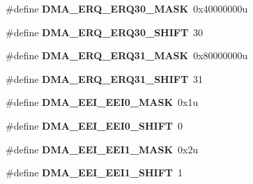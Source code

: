 \begin{DoxyCompactItemize}
\item 
\hypertarget{group___d_m_a___register___masks_gadb234616ad0f4a6c90070a3b9a4fefec}{}\#define {\bfseries D\+M\+A\+\_\+\+E\+R\+Q\+\_\+\+E\+R\+Q30\+\_\+\+M\+A\+S\+K}~0x40000000u\label{group___d_m_a___register___masks_gadb234616ad0f4a6c90070a3b9a4fefec}

\item 
\hypertarget{group___d_m_a___register___masks_ga719fe2117fcfe92235c29015478f55d3}{}\#define {\bfseries D\+M\+A\+\_\+\+E\+R\+Q\+\_\+\+E\+R\+Q30\+\_\+\+S\+H\+I\+F\+T}~30\label{group___d_m_a___register___masks_ga719fe2117fcfe92235c29015478f55d3}

\item 
\hypertarget{group___d_m_a___register___masks_ga725ce5d7f6bf2d069cfff6be1e7ab4b9}{}\#define {\bfseries D\+M\+A\+\_\+\+E\+R\+Q\+\_\+\+E\+R\+Q31\+\_\+\+M\+A\+S\+K}~0x80000000u\label{group___d_m_a___register___masks_ga725ce5d7f6bf2d069cfff6be1e7ab4b9}

\item 
\hypertarget{group___d_m_a___register___masks_ga4f543801f376ff65e158a8d4faf2dd19}{}\#define {\bfseries D\+M\+A\+\_\+\+E\+R\+Q\+\_\+\+E\+R\+Q31\+\_\+\+S\+H\+I\+F\+T}~31\label{group___d_m_a___register___masks_ga4f543801f376ff65e158a8d4faf2dd19}

\item 
\hypertarget{group___d_m_a___register___masks_gaacd526dbbb455151535c6e8d7e371477}{}\#define {\bfseries D\+M\+A\+\_\+\+E\+E\+I\+\_\+\+E\+E\+I0\+\_\+\+M\+A\+S\+K}~0x1u\label{group___d_m_a___register___masks_gaacd526dbbb455151535c6e8d7e371477}

\item 
\hypertarget{group___d_m_a___register___masks_gac4abb698bc75b24811557b2037d828c6}{}\#define {\bfseries D\+M\+A\+\_\+\+E\+E\+I\+\_\+\+E\+E\+I0\+\_\+\+S\+H\+I\+F\+T}~0\label{group___d_m_a___register___masks_gac4abb698bc75b24811557b2037d828c6}

\item 
\hypertarget{group___d_m_a___register___masks_gabb59616391e640e07162d0d33c0382d9}{}\#define {\bfseries D\+M\+A\+\_\+\+E\+E\+I\+\_\+\+E\+E\+I1\+\_\+\+M\+A\+S\+K}~0x2u\label{group___d_m_a___register___masks_gabb59616391e640e07162d0d33c0382d9}

\item 
\hypertarget{group___d_m_a___register___masks_ga9c162765569a8cc74e648841337f09e2}{}\#define {\bfseries D\+M\+A\+\_\+\+E\+E\+I\+\_\+\+E\+E\+I1\+\_\+\+S\+H\+I\+F\+T}~1\label{group___d_m_a___register___masks_ga9c162765569a8cc74e648841337f09e2}


\end{DoxyCompactItemize}
